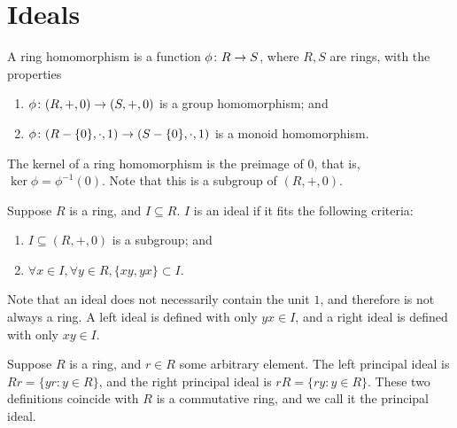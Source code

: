 \section{Ideals}

\begin{definition}
    A ring homomorphism is a function \(\phi\colon R\to S\),
    where \(R,S\) are rings,
    with the properties
    \begin{enumerate}[label={(\roman*)}, itemsep=0mm]
        \item \(\phi\colon(R,+,0)\to(S,+,0)\) is a group homomorphism; and
        \item \(\phi\colon(R - \{0\},\cdot,1)\to(S - \{0\},\cdot,1)\)
            is a monoid homomorphism.
    \end{enumerate}
\end{definition}
\begin{definition}
    The kernel of a ring homomorphism
    is the preimage of \(0\),
    that is, \(\ker\phi = \phi^{-1}(0)\).
    Note that this is a subgroup of \((R,+,0)\).
\end{definition}

\begin{definition}
    Suppose \(R\) is a ring, and \(I \subseteq R\).
    \(I\) is an ideal if it fits the following criteria:
    \begin{enumerate}[label={(\roman*)}, itemsep=0mm]
        \item \(I \subseteq (R,+,0)\) is a subgroup; and
        \item \(\forall x \in I, \forall y \in R, \{xy,yx\} \subset I\).
    \end{enumerate}
    Note that an ideal does not necessarily contain the unit \(1\),
    and therefore is not always a ring.
    A left ideal is defined with only \(yx \in I\),
    and a right ideal is defined with only \(xy \in I\).
\end{definition}

\begin{definition}
    Suppose \(R\) is a ring, and \(r \in R\) some arbitrary element.
    The left principal ideal is \(Rr = \{yr : y \in R\}\),
    and the right principal ideal is \(rR = \{ry : y \in R\}\).
    These two definitions coincide with \(R\) is a commutative ring,
    and we call it the principal ideal.
\end{definition}

